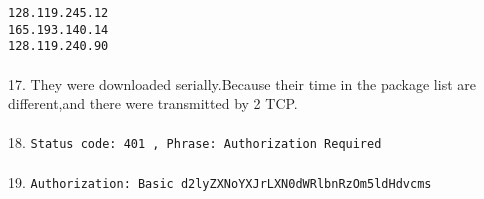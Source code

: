\documentclass[a4paper]{article}
\begin{document}
{	\indent	\verb|128.119.245.12|\\
	\indent	\verb|165.193.140.14|\\
	\indent	\verb|128.119.240.90|
	\\\\
17. They were downloaded serially.Because their time in the package list are different,and there were transmitted by 2 TCP.\\\\
18. \verb|Status code: 401 , Phrase: Authorization Required |\\\\
19. \verb|Authorization: Basic d2lyZXNoYXJrLXN0dWRlbnRzOm5ldHdvcms|\\\\
}

\end{document}
